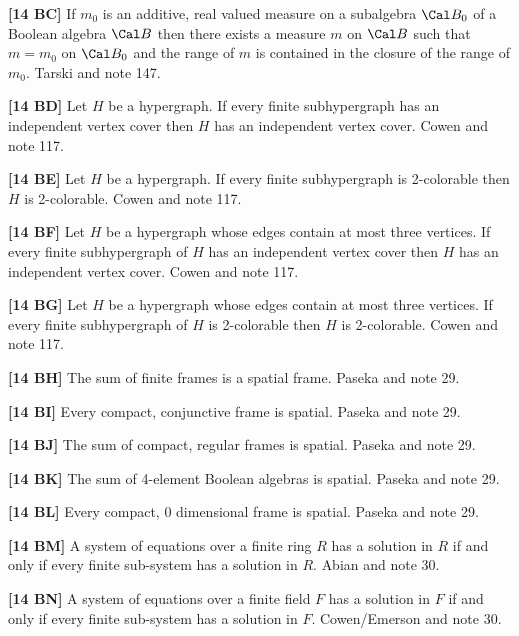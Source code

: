 \item{}{\bf [14 BC]}  If $m_0$ is an additive, real valued measure on a
subalgebra $\Cal B_0$ of a Boolean algebra $\Cal B$ then there exists
a measure $m$ on $\Cal B$ such that $m=m_0$ on $\Cal B_0$ and the range
of $m$ is contained in the closure of the range of $m_0$.
\ac{Tarski} \cite{1930} and note 147.
\smallskip
\item{}{\bf [14 BD]} Let $H$ be a hypergraph. If every finite subhypergraph
has an independent vertex cover then $H$ has an independent vertex cover.
\ac{Cowen} \cite{1990} and note 117.
\smallskip
\item{}{\bf [14 BE]} Let $H$ be a hypergraph. If every finite subhypergraph
is 2-colorable then $H$ is 2-colorable. \ac{Cowen} \cite{1990} and note 117.
\smallskip
\item{}{\bf [14 BF]}  Let $H$ be a hypergraph whose edges contain at most
three vertices. If every finite subhypergraph of $H$ has an independent
vertex cover then $H$ has an independent vertex cover.
\ac{Cowen} \cite{1990} and note 117.
\smallskip
\item{}{\bf [14 BG]}  Let $H$ be a hypergraph whose edges contain at most
three vertices. If every finite subhypergraph of $H$ is 2-colorable then
$H$ is 2-colorable.  \ac{Cowen} \cite{1990} and note 117.
\smallskip
\item{}{\bf [14 BH]} The sum of finite frames is a spatial frame.
\ac{Paseka} \cite{1989} and note 29.
\smallskip
\item{}{\bf [14 BI]} Every compact, conjunctive frame is spatial.
\ac{Paseka} \cite{1989} and note 29.
\smallskip
\item{}{\bf [14 BJ]} The sum of compact, regular frames is spatial.
\ac{Paseka} \cite{1989} and note 29.
\smallskip
\item{}{\bf [14 BK]} The sum of 4-element Boolean algebras is spatial.
\ac{Paseka} \cite{1989} and note 29.
\smallskip
\item{}{\bf [14 BL]} Every compact, 0 dimensional frame is spatial.
\ac{Paseka} \cite{1989} and note 29.
\smallskip
\item{}{\bf [14 BM]}  A system of equations over a finite
ring $R$ has a solution in $R$ if and only if every finite sub-system
has a solution in $R$.  \ac{Abian} \cite{1972} and note 30.
\smallskip
\item{}{\bf [14 BN]} A system of equations over a finite field $F$ has a
solution in $F$ if and only if every finite sub-system has a solution
in $F$. \ac{Cowen/Emerson} \cite{1996} and note 30.
